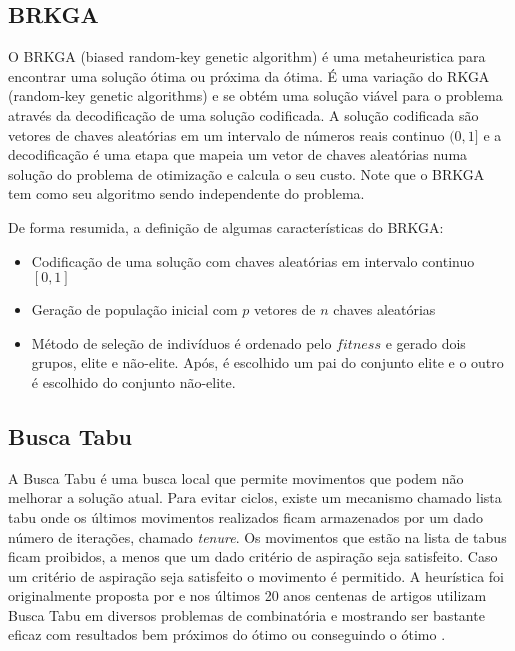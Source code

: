 \documentclass[12pt,a4paper]{article}
\begin{document}
\subsection{}

\subsection{BRKGA}
O BRKGA (biased random-key genetic algorithm)\cite{gonccalves2011biased} é uma metaheuristica para encontrar uma solução ótima ou próxima da ótima. É uma variação do RKGA
(random-key genetic algorithms) \cite{bean1994genetic} e se obtém uma solução viável para o problema através da decodificação de uma solução codificada. A solução codificada são vetores de
chaves aleatórias em um intervalo de números reais continuo $(0,1]$ e a decodificação é uma etapa que mapeia um vetor de chaves aleatórias numa solução do problema de otimização e calcula o
seu custo. Note que o BRKGA tem como seu algoritmo sendo independente do problema. 

De forma resumida, a definição de algumas características do BRKGA: 


\begin{itemize}
\item Codificação de uma solução com chaves aleatórias em intervalo continuo $[0,1]$ 
\item Geração de população inicial com $p$ vetores de $n$ chaves aleatórias
\item Método de seleção de indivíduos é ordenado pelo $fitness$ e gerado dois grupos, elite e não-elite. Após, é escolhido um pai do conjunto elite e o outro é escolhido do conjunto não-elite. 
\end{itemize}

\subsection{Busca Tabu}
A Busca Tabu é uma busca local que permite movimentos que podem não melhorar a solução atual. Para evitar ciclos, existe um mecanismo chamado lista tabu onde os últimos movimentos realizados
ficam armazenados por um dado número de iterações, chamado \textit{tenure}. Os movimentos que estão na lista de tabus ficam proibidos, a menos que um dado critério de aspiração seja
satisfeito. Caso um critério de aspiração seja satisfeito o movimento é permitido. A heurística foi originalmente proposta por \citeauthor{glover1986future} \cite{glover1986future} e nos
últimos 20 anos centenas de artigos utilizam Busca Tabu em diversos problemas de combinatória e mostrando ser bastante eficaz com resultados bem próximos do ótimo ou conseguindo o ótimo
\cite{gendreau2010handbook}.
\end{document}
